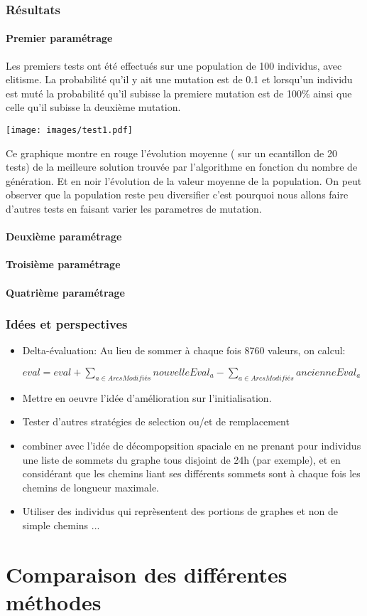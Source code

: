 \documentclass[a4paper]{report}
\begin{document}
\subsection{Résultats}
\subsubsection*{Premier paramétrage}
Les premiers tests ont été effectués sur une population de 100 individus, avec elitisme. La probabilité qu'il y ait une mutation est de 0.1 et lorsqu'un individu est muté la probabilité qu'il subisse la premiere mutation est de 100$\%$ ainsi que celle qu'il subisse la deuxième mutation.\\
\begin{center}
\texttt{[image: images/test1.pdf]}
\end{center}
Ce graphique montre en rouge l'évolution moyenne ( sur un ecantillon de 20 tests) de la  meilleure solution trouvée par l'algorithme en fonction du nombre de génération. Et en noir l'évolution de la valeur moyenne de la population. On peut observer que la population reste peu diversifier c'est pourquoi nous allons faire d'autres tests en faisant varier les parametres de mutation.\\
\subsubsection*{Deuxième paramétrage}
\subsubsection*{Troisième paramétrage}
\subsubsection*{Quatrième paramétrage}
\subsection{Idées et perspectives}
\begin{itemize}
  \item Delta-évaluation: Au lieu de sommer à chaque fois 8760 valeurs, on calcul:
  \begin{center}
     $eval= eval + \sum_{a \in ArcsModifiés} nouvelleEval_a - \sum_{a \in ArcsModifiés} ancienneEval_a$
    
  \end{center}
  \item Mettre en oeuvre l'idée d'amélioration sur l'initialisation.
  \item Tester d'autres stratégies de selection ou/et de remplacement
  \item combiner avec l'idée de décompopsition spaciale en ne prenant pour individus une liste de sommets du graphe tous disjoint de 24h (par exemple), et en considérant que les chemins liant ses différents sommets sont à chaque fois les chemins de longueur maximale.
  
  \item Utiliser des individus qui reprèsentent des portions de graphes et non de simple chemins ...
  
\end{itemize}
\chapter{Comparaison des différentes méthodes}
\end{document}
